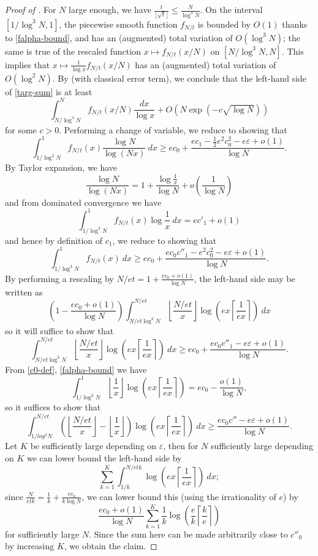 \documentclass[10pt,a4paper,reqno]{amsart}
\numberwithin{equation}{section}
\theoremstyle{plain}
\theoremstyle{definition}
\newcommand\eps{\varepsilon}
\begin{document}
\begin{proof}[Proof of ]
    For $N$ large enough, we have $\frac{t}{\lfloor\sqrt{t}\rfloor} \leq \frac{N}{\log^3 N}$.
    On the interval $[1/\log^3 N,1]$, the piecewise smooth function $f_{N/t}$ is bounded by $O(1)$ thanks to \eqref{falpha-bound}, and has an (augmented) total variation of $O(\log^3\! N)$; the same is true of the rescaled function $x \mapsto f_{N/t}(x/N)$ on $[N/\log^3\! N,N]$.   This implies that $x \mapsto \frac{1}{\log x} f_{N/t}(x/N)$ has an (augmented) total variation of $O(\log^2 N)$.
   By  (with classical error term), we conclude that the left-hand side of \eqref{targ-sum} is at least
    $$ \int_{N/\log^3 N}^N f_{N/t}(x/N) \frac{dx}{\log x} + O\left( N \exp(-c\sqrt{\log N}) \right)$$
    for some $c>0$.  Performing a change of variable, we reduce to showing that
    $$  \int_{1/\log^3 N}^1 f_{N/t}(x) \frac{\log N}{\log(Nx)}\ dx 
    \geq  ec_0 + \frac{ec_1 - \frac{1}{2} e^2 c_0^2 - e \eps + o(1)}{\log N}.$$
    By Taylor expansion, we have
    $$ \frac{\log N}{\log(Nx)} = 1 + \frac{\log \frac{1}{x}}{\log N}  + o\left(\frac{1}{\log N}\right)$$
    and from dominated convergence we have
  $$
  \int_{1/\log^3 N}^1 f_{N/t}(x) \log \frac{1}{x}\ dx = ec'_1 + o(1)$$
and hence by definition of $c_1$, we reduce to showing that
$$  \int_{1/\log^3 N}^1 f_{N/t}(x)\ dx 
\geq  ec_0 + \frac{ec_0 c''_1 - e^2 c_0^2 - e\eps + o(1)}{\log N}.$$
By performing a rescaling by $N/et = 1 + \frac{ec_0+o(1)}{\log N}$, the left-hand side may be written as
$$ \left(1 - \frac{ec_0+o(1)}{\log N}\right) \int_{N/et\log^3 N}^{N/et}
\left\lfloor \frac{N/et}{x} \right\rfloor \log\left(ex \left\lceil \frac{1}{ex} \right\rceil \right)\ dx$$
so it will suffice to show that
$$
\int_{N/et\log^3 N}^{N/et}
\left\lfloor \frac{N/et}{x} \right\rfloor \log\left(ex \left\lceil \frac{1}{ex} \right\rceil \right)\ dx \geq ec_0 + \frac{ec_0 c''_1 - e\eps + o(1)}{\log N}.$$
From \eqref{c0-def}, \eqref{falpha-bound} we have
$$ \int_{1/\log^2 N}^1 \left\lfloor \frac{1}{x} \right\rfloor \log\left(ex \left\lceil \frac{1}{ex} \right\rceil \right) = ec_0 - \frac{o(1)}{\log N},$$
so it suffices to show that
$$
\int_{1/log^2 N}^{N/et}
\left(\left\lfloor \frac{N/et}{x} \right\rfloor - \left\lfloor \frac{1}{x} \right\rfloor\right) \log\left(ex \left\lceil \frac{1}{ex} \right\rceil \right)\ dx \geq \frac{ec_0 c'' - e\eps + o(1)}{\log N}.$$
Let $K$ be sufficiently large depending on $\eps$, then for $N$ sufficiently large depending on $K$ we can lower bound the left-hand side by
$$ \sum_{k=1}^K \int_{1/k}^{N/etk} \log\left(ex \left\lceil \frac{1}{ex} \right\rceil \right)\ dx;$$
since $\frac{N}{etk} = \frac{1}{k} + \frac{ec_0}{k \log N}$, we can lower bound this (using the irrationality of $e$) by
$$ \frac{ec_0+o(1)}{\log N} \sum_{k=1}^K \frac{1}{k} \log\left(\frac{e}{k} \left\lceil \frac{k}{e} \right\rceil\right)$$
for sufficiently large $N$.  Since the sum here can be made arbitrarily close to $c''_0$ by increasing $K$, we obtain the claim.
\end{proof}
    
\end{document}
